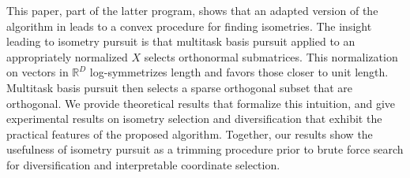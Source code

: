 This paper, part of the latter program, shows that an adapted version of the algorithm in \citet{Koelle2024-no} leads to a convex procedure for finding isometries.
The insight leading to isometry pursuit is that multitask basis pursuit applied to an appropriately normalized $ X$ selects orthonormal submatrices.
This normalization on vectors in $\mathbb R^D$ log-symmetrizes length and favors those closer to unit length.
Multitask basis pursuit then selects a sparse orthogonal subset that are orthogonal.
We provide theoretical results that formalize this intuition, and give experimental results on isometry selection and diversification that exhibit the practical features of the proposed algorithm.
Together, our results show the usefulness of isometry pursuit as a trimming procedure prior to brute force search for diversification and interpretable coordinate selection.

